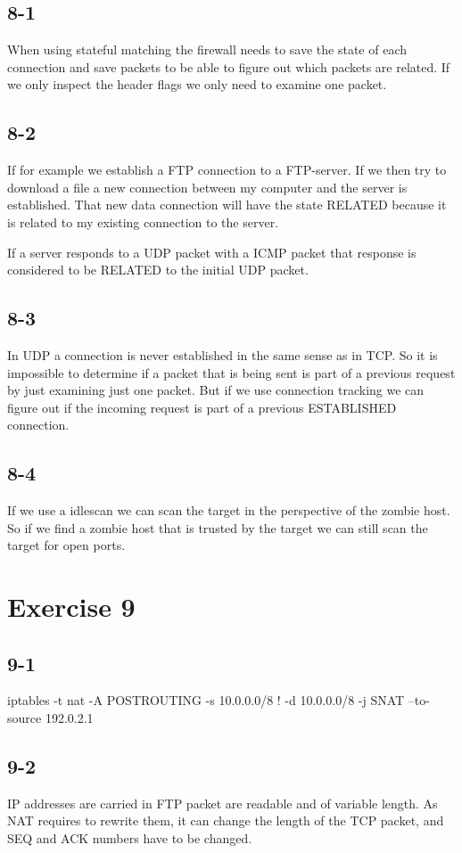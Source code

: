 \documentclass[12pt]{article}
\begin{document}
\subsection*{8-1}
When using stateful matching the firewall needs to save the state of each connection and save packets to be able to figure out which packets are related. If we only inspect the header flags we only need to examine one packet.

\subsection*{8-2}
If for example we establish a FTP connection to a FTP-server. If we then try to download a file a new connection between my computer and the server is established. That new data connection will have the state RELATED because it is related to my existing connection to the server.

If a server responds to a UDP packet with a ICMP packet that response is considered to be RELATED to the initial UDP packet.

\subsection*{8-3}
In UDP a connection is never established in the same sense as in TCP. So it is impossible to determine if a packet that is being sent is part of a previous request by just examining just one packet. But if we use connection tracking we can figure out if the incoming request is part of a previous ESTABLISHED connection.

\subsection*{8-4}
If we use a idlescan we can scan the target in the perspective of the zombie host. So if we find a zombie host that is trusted by the target we can still scan the target for open ports.

\section*{Exercise 9}
\subsection*{9-1}
iptables -t nat -A POSTROUTING -s 10.0.0.0/8 ! -d 10.0.0.0/8 -j SNAT --to-source 192.0.2.1

\subsection*{9-2}
IP addresses are carried in FTP packet are readable and of variable length. As NAT requires to rewrite them, it can change the length of the TCP packet, and SEQ and ACK numbers have to be changed.
\end{document}
